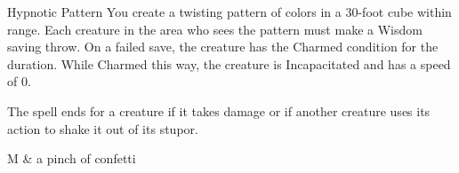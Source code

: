 \begin{Spell}[
  tags=Concentration,
  level={3rd},
  time={1 action},
  range={120 ft/30 ft cube},
  components={S, M},
  duration={1 minute},
  school={Illusion},
  attack={WIS Save},
  effect={Control}
]{Hypnotic Pattern}
You create a twisting pattern of colors in a 30-foot cube within range. Each creature in the area who sees the pattern must make a Wisdom saving throw. On a failed save, the creature has the Charmed condition for the duration. While Charmed this way, the creature is Incapacitated and has a speed of 0.

The spell ends for a creature if it takes damage or if another creature uses its action to shake it out of its stupor.

\begin{components}
M & a pinch of confetti
\end{components}
\end{Spell}


